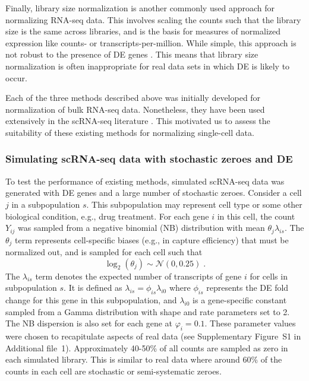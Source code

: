 \documentclass{bmcart}
\newcommand{\suppkleinparam}{S1}
\newcommand{\revised}[1]{#1}
\begin{document}
Finally, library size normalization is another commonly used approach for normalizing RNA-seq data.
This involves scaling the counts such that the library size is the same across libraries,
    and is the basis for measures of normalized expression like counts- or transcripts-per-million.
While simple, this approach is not robust to the presence of DE genes \cite{anders2010differential,robinson2010scaling}.
\revised{This means that library size normalization is often inappropriate for real data sets in which DE is likely to occur.}

\revised{Each of the three methods described above was initially developed for normalization of bulk RNA-seq data.
Nonetheless, they have been used extensively in the scRNA-seq literature \cite{saraiva2015hierarchical, kolod2015single, llorens2015singlecell, li2016singlecell, deng2014singlecell, freeman2015singlecell}.
This motivated us to assess the suitability of these existing methods for normalizing single-cell data.}

\subsubsection*{Simulating scRNA-seq data with stochastic zeroes and DE}
To test the performance of existing methods, simulated scRNA-seq data was generated with DE genes and a large number of stochastic zeroes.
Consider a cell $j$ in a subpopulation $s$.
This subpopulation may represent cell type or some other biological condition, e.g., drug treatment. 
For each gene $i$ in this cell, the count $Y_{ij}$ was sampled from a negative binomial (NB) distribution with mean $\theta_{j}\lambda_{is}$.
The $\theta_{j}$ term represents cell-specific biases (e.g., in capture efficiency) that must be normalized out, 
    and is sampled for each cell such that 
\[
\log_2(\theta_j) \sim \mathcal{N}(0, 0.25) \;.
\]
The $\lambda_{is}$ term denotes the expected number of transcripts of gene $i$ for cells in subpopulation $s$.
It is defined as $\lambda_{is}=\phi_{is}\lambda_{i0}$ where $\phi_{is}$ represents the DE fold change for this gene in this subpopulation, and \revised{$\lambda_{i0}$ is a gene-specific constant sampled from a Gamma distribution with shape and rate parameters set to 2.
The NB dispersion is also set for each gene at $\varphi_i = 0.1$.
These parameter values were chosen to recapitulate aspects of real data \cite{klein2015droplet} (see Supplementary Figure~\suppkleinparam{} in Additional file~1).}
Approximately 40-50\% of all counts are sampled as zero in each simulated library.
This is similar to real data where around 60\% of the counts in each cell are stochastic or semi-systematic zeroes.
\end{document}
